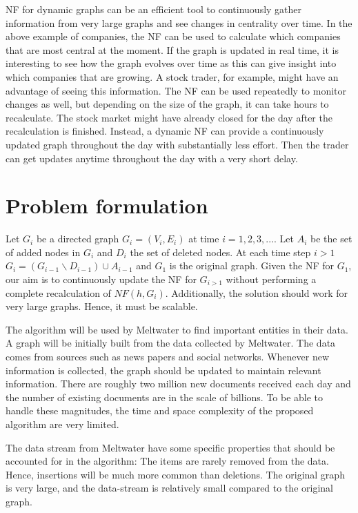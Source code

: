 NF for dynamic graphs can be an efficient tool to continuously gather information from very large graphs and see changes in centrality over time. In the above example of companies, the NF can be used to calculate which companies that are most central at the moment. If the graph is updated in real time, it is interesting to see how the graph evolves over time as this can give insight into which companies that are growing. A stock trader, for example, might have an advantage of seeing this information. The NF can be used repeatedly to monitor changes as well, but depending on the size of the graph, it can take hours to recalculate. The stock market might have already closed for the day after the recalculation is finished. Instead, a dynamic NF can provide a continuously updated graph throughout the day with substantially less effort. Then the trader can get updates anytime throughout the day with a very short delay.

\section{Problem formulation}
Let $G_i$ be a directed graph $G_i = (V_i,E_i)$ at time $i = 1,2,3,...$.
Let $A_i$ be the set of added nodes in $G_i$ and $D_i$ the set of deleted nodes. 
At each time step $i > 1$ $G_i = (G_{i-1} \backslash D_{i-1}) \cup A_{i-1}$ and $G_1$ is the original graph. Given the NF for $G_1$, our aim is to continuously update the NF for $G_{i>1}$ without performing a complete recalculation of $NF(h,G_i)$. Additionally, the solution should work for very large graphs. Hence, it must be scalable. 

The algorithm will be used by Meltwater to find important entities in their data. A graph will be initially built from the data collected by Meltwater. The data comes from sources such as news papers and social networks. Whenever new information is collected, the graph should be updated to maintain relevant information. There are roughly two million new documents received each day and the number of existing documents are in the scale of billions. To be able to handle these magnitudes, the time and space complexity of the proposed algorithm are very limited.

The data stream from Meltwater have some specific properties that should be accounted for in the algorithm: The items are rarely removed from the data. Hence, insertions will be much more common than deletions. The original graph is very large, and the data-stream is relatively small compared to the original graph. 

